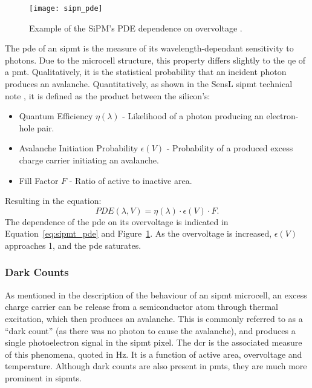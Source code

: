 \begin{figure}
	\centering
    \texttt{[image: sipm\_pde]} 
	\caption[Example of the SiPM's PDE dependence on overvoltage.]{Example of the SiPM's PDE dependence on overvoltage \cite{SensL2011}.}
	\label{fig:sipm_pde}
\end{figure}

The \gls{pde} of an \gls{sipmt} is the measure of its wavelength-dependant sensitivity to photons. Due to the microcell structure, this property differs slightly to the \gls{qe} of a \gls{pmt}. Qualitatively, it is the statistical probability that an incident photon produces an avalanche. Quantitatively, as shown in the SensL \gls{sipmt} technical note \cite{SensL2011}, it is defined as the product between the silicon's:
\begin{itemize}
\item Quantum Efficiency $\eta(\lambda)$ - Likelihood of a photon producing an electron-hole pair. 
\item Avalanche Initiation Probability $\epsilon(V)$ - Probability of a produced excess charge carrier initiating an avalanche.
\item Fill Factor $F$ - Ratio of active to inactive area.
\end{itemize}
Resulting in the equation:
\begin{equation} \label{eq:sipmt_pde}
PDE(\lambda, V) = \eta(\lambda) \cdot \epsilon(V) \cdot F.
\end{equation}
The dependence of the \gls{pde} on its overvoltage is indicated in Equation~\ref{eq:sipmt_pde} and Figure~\ref{fig:sipm_pde}. As the overvoltage is increased, $\epsilon(V)$ approaches 1, and the \gls{pde} saturates.

\subsubsection{Dark Counts}

As mentioned in the description of the behaviour of an \gls{sipmt} microcell, an excess charge carrier can be release from a semiconductor atom through thermal excitation, which then produces an avalanche. This is commonly referred to as a ``dark count'' (as there was no photon to cause the avalanche), and produces a single photoelectron signal in the \gls{sipmt} pixel. The \gls{dcr} is the associated measure of this phenomena, quoted in \si{Hz}. It is a function of active area, overvoltage and temperature. Although dark counts are also present in \glspl{pmt}, they are much more prominent in \glspl{sipmt}.

